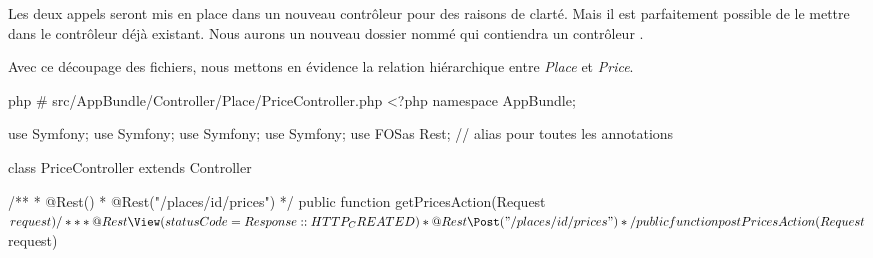 \documentclass[big]{zmdocument}
\begin{document}



Les deux appels seront mis en place dans un nouveau contrôleur pour des raisons de clarté. Mais il est parfaitement possible de le mettre dans le contrôleur déjà existant. Nous aurons un nouveau dossier nommé  qui contiendra un contrôleur .



Avec ce découpage des fichiers, nous mettons en évidence la relation hiérarchique entre \textit{Place} et \textit{Price}.



\begin{CodeBlock}{php}
# src/AppBundle/Controller/Place/PriceController.php
<?php
namespace AppBundle\Controller\Place;

use Symfony\Bundle\FrameworkBundle\Controller\Controller;
use Symfony\Component\HttpFoundation\Request;
use Symfony\Component\HttpFoundation\JsonResponse;
use Symfony\Component\HttpFoundation\Response;
use FOS\RestBundle\Controller\Annotations as Rest; // alias pour toutes les annotations

class PriceController extends Controller
{

    /**
     * @Rest\View()
     * @Rest\Get("/places/{id}/prices")
     */
    public function getPricesAction(Request $request)
    {
       
    }

     /**
     * @Rest\View(statusCode=Response::HTTP_CREATED)
     * @Rest\Post("/places/{id}/prices")
     */
    public function postPricesAction(Request $request)
    {
       
    }
}
\end{CodeBlock}
\end{document}
